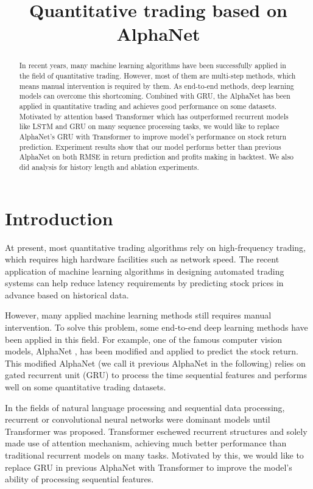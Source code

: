 \documentclass{article}
\title{Quantitative trading based on AlphaNet}
\begin{document}
\maketitle

\begin{abstract}
  \hspace{16}In recent years, many machine learning algorithms have been successfully applied in the field of quantitative trading. However, most of them are multi-step methods, which means manual intervention is required by them. As end-to-end methods, deep learning models can overcome this shortcoming. Combined with GRU, the AlphaNet has been applied in quantitative trading and achieves good performance on some datasets. Motivated by attention based Transformer which has outperformed recurrent models like LSTM and GRU on many sequence processing tasks, we would like to replace AlphaNet's GRU with Transformer to improve model's performance on stock return prediction. Experiment results show that our model performs better than previous AlphaNet on both RMSE in return prediction and profits making in backtest. We also did analysis for history length and ablation experiments.
\end{abstract}

\section{Introduction}
\hspace{16}At present, most quantitative trading algorithms rely on high-frequency trading, which requires high hardware facilities such as network speed. The recent application of machine learning algorithms in designing automated trading systems can help reduce latency requirements by predicting stock prices in advance based on historical data.\cite{can_ml}

\hspace{16}However, many applied machine learning methods still requires manual intervention.\cite{huatai_gp} To solve this problem, some end-to-end deep learning methods have been applied in this field. For example, one of the famous computer vision models, AlphaNet \cite{alphanet}, has been modified and applied to predict the stock return. \cite{huatai_alphanet} This modified AlphaNet (we call it previous AlphaNet in the following) relies on gated recurrent unit (GRU) to process the time sequential features and performs well on some quantitative trading datasets.

\hspace{16}In the fields of natural language processing and sequential data processing, recurrent or convolutional neural networks were dominant models until Transformer was proposed.\cite{transformer} Transformer eschewed recurrent structures and solely made use of attention mechanism, achieving much better performance than traditional recurrent models on many tasks.\cite{transformer}\cite{transformer_better1}\cite{transformer_better2} Motivated by this, we would like to replace GRU in previous AlphaNet with Transformer to improve the model's ability of processing sequential features.
\end{document}
